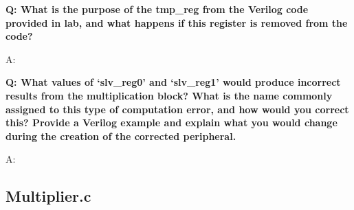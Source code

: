 \documentclass[11pt,letterpaper,titlepage]{article}
\begin{document}
\textbf{Q: What is the purpose of the tmp\_reg from the Verilog code provided in lab, and what happens if
this register is removed from the code?}

A:

\textbf{Q: What values of ‘slv\_reg0’ and ‘slv\_reg1’ would produce incorrect results from the multiplication
block? What is the name commonly assigned to this type of computation error, and how would
you correct this? Provide a Verilog example and explain what you would change during the
creation of the corrected peripheral.}

A:

\newpage

\begin{appendices}

\section{Multiplier.c}
\label{appendix:multiplier_c}


\end{appendices}
\end{document}
